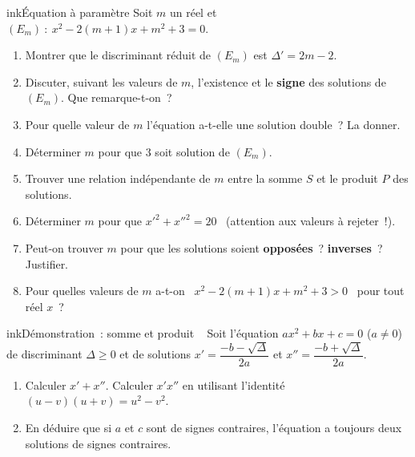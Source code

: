 \begin{exo}{ink}{Équation à paramètre }
Soit $m$ un réel et \ $(E_m)~:\ x^2-2(m+1)x+m^2+3=0$.
\begin{enumerate}
  \item Montrer que le discriminant réduit de $(E_m)$ est $\Delta'=2m-2$.
  \item Discuter, suivant les valeurs de $m$, l'existence et le \textbf{signe} des solutions de $(E_m)$. Que remarque-t-on~?
  \item Pour quelle valeur de $m$ l'équation a-t-elle une solution double~? La donner.
  \item Déterminer $m$ pour que $3$ soit solution de $(E_m)$.
  \item Trouver une relation indépendante de $m$ entre la somme $S$ et le produit $P$ des solutions.
  \item Déterminer $m$ pour que $x'^2+x''^2=20$ \ (attention aux valeurs à rejeter~!).
  \item Peut-on trouver $m$ pour que les solutions soient \textbf{opposées}~? \textbf{inverses}~? Justifier.
  \item Pour quelles valeurs de $m$ a-t-on \ $x^2-2(m+1)x+m^2+3>0$ \ pour tout réel $x$~?
\end{enumerate}
\end{exo}

\begin{exo}{ink}{Démonstration~: somme et produit \demo\ }
Soit l'équation $ax^2+bx+c=0$ ($a\neq0$) de discriminant $\Delta\geq0$ et de solutions $x'=\dfrac{-b-\sqrt\Delta}{2a}$ et $x''=\dfrac{-b+\sqrt\Delta}{2a}$.
\begin{enumerate}
  \item Calculer $x'+x''$. Calculer $x'x''$ en utilisant l'identité $(u-v)(u+v)=u^2-v^2$.
  \item En déduire que si $a$ et $c$ sont de signes contraires, l'équation a toujours deux solutions de signes contraires.
\end{enumerate}
\end{exo}


